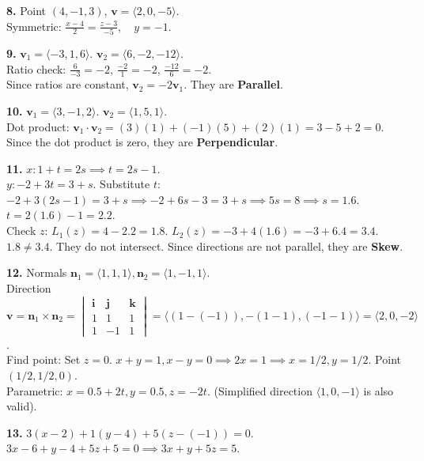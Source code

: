 \documentclass[12pt]{article}
\begin{document}
\textbf{8.} 
Point $(4, -1, 3)$, $\mathbf{v} = \langle 2, 0, -5 \rangle$. \\
Symmetric: $\frac{x-4}{2} = \frac{z-3}{-5}, \quad y = -1$.

\textbf{9.} 
$\mathbf{v}_1 = \langle -3, 1, 6 \rangle$. $\mathbf{v}_2 = \langle 6, -2, -12 \rangle$. \\
Ratio check: $\frac{6}{-3} = -2$, $\frac{-2}{1} = -2$, $\frac{-12}{6} = -2$. \\
Since ratios are constant, $\mathbf{v}_2 = -2\mathbf{v}_1$. They are \textbf{Parallel}.

\textbf{10.} 
$\mathbf{v}_1 = \langle 3, -1, 2 \rangle$. $\mathbf{v}_2 = \langle 1, 5, 1 \rangle$. \\
Dot product: $\mathbf{v}_1 \cdot \mathbf{v}_2 = (3)(1) + (-1)(5) + (2)(1) = 3 - 5 + 2 = 0$. \\
Since the dot product is zero, they are \textbf{Perpendicular}.

\textbf{11.} 
$x: 1+t = 2s \implies t = 2s - 1$. \\
$y: -2+3t = 3+s$. Substitute $t$: $-2 + 3(2s-1) = 3+s \implies -2 + 6s - 3 = 3+s \implies 5s = 8 \implies s = 1.6$. \\
$t = 2(1.6) - 1 = 2.2$. \\
Check $z$: $L_1(z) = 4 - 2.2 = 1.8$. $L_2(z) = -3 + 4(1.6) = -3 + 6.4 = 3.4$. \\
$1.8 \neq 3.4$. They do not intersect. Since directions are not parallel, they are \textbf{Skew}.

\textbf{12.} 
Normals $\mathbf{n}_1 = \langle 1, 1, 1 \rangle, \mathbf{n}_2 = \langle 1, -1, 1 \rangle$. \\
Direction $\mathbf{v} = \mathbf{n}_1 \times \mathbf{n}_2 = \begin{vmatrix} \mathbf{i} & \mathbf{j} & \mathbf{k} \\ 1 & 1 & 1 \\ 1 & -1 & 1 \end{vmatrix} = \langle (1-(-1)), -(1-1), (-1-1) \rangle = \langle 2, 0, -2 \rangle$. \\
Find point: Set $z=0$. $x+y=1, x-y=0 \implies 2x=1 \implies x=1/2, y=1/2$. Point $(1/2, 1/2, 0)$. \\
Parametric: $x = 0.5 + 2t, y = 0.5, z = -2t$. (Simplified direction $\langle 1, 0, -1 \rangle$ is also valid).

\textbf{13.} 
$3(x-2) + 1(y-4) + 5(z - (-1)) = 0$. \\
$3x - 6 + y - 4 + 5z + 5 = 0 \implies 3x + y + 5z = 5$.
\end{document}
